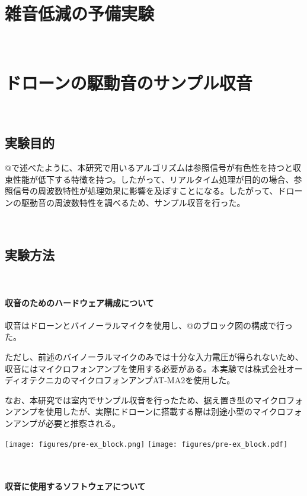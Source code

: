 \
\section{雑音低減の予備実験}\label{ux96d1ux97f3ux4f4eux6e1bux306eux4e88ux5099ux5b9fux9a13}

\
\section{ドローンの駆動音のサンプル収音}\label{ux30c9ux30edux30fcux30f3ux306eux99c6ux52d5ux97f3ux306eux30b5ux30f3ux30d7ux30ebux53ceux97f3}

\
\subsection{実験目的}\label{ux5b9fux9a13ux76eeux7684}

@で述べたように、本研究で用いるアルゴリズムは参照信号が有色性を持つと収束性能が低下する特徴を持つ。したがって、リアルタイム処理が目的の場合、参照信号の周波数特性が処理効果に影響を及ぼすことになる。したがって、ドローンの駆動音の周波数特性を調べるため、サンプル収音を行った。

\
\subsection{実験方法}\label{ux5b9fux9a13ux65b9ux6cd5}

\
\paragraph{収音のためのハードウェア構成について}\label{ux53ceux97f3ux306eux305fux3081ux306eux30cfux30fcux30c9ux30a6ux30a7ux30a2ux69cbux6210ux306bux3064ux3044ux3066}

収音はドローンとバイノーラルマイクを使用し、@のブロック図の構成で行った。

ただし、前述のバイノーラルマイクのみでは十分な入力電圧が得られないため、収音にはマイクロフォンアンプを使用する必要がある。本実験では株式会社オーディオテクニカのマイクロフォンアンプAT-MA2を使用した。

なお、本研究では室内でサンプル収音を行ったため、据え置き型のマイクロフォンアンプを使用したが、実際にドローンに搭載する際は別途小型のマイクロフォンアンプが必要と推察される。

\texttt{[image: figures/pre-ex\_block.png]}
\texttt{[image: figures/pre-ex\_block.pdf]}

\
\paragraph{収音に使用するソフトウェアについて}\label{ux53ceux97f3ux306bux4f7fux7528ux3059ux308bux30bdux30d5ux30c8ux30a6ux30a7ux30a2ux306bux3064ux3044ux3066}


